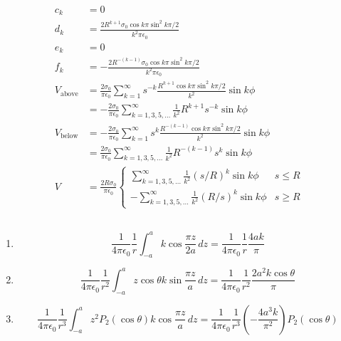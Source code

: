 \documentclass{article}
\newcommand{\ke}{\frac{1}{4 \pi \epsilon_0}}
\begin{document}
\begin{align*}
  c_k            & = 0                                                                                                                           \\
  d_k            & = \frac{2 R^{k + 1} \sigma_0 \cos k \pi \sin^2 k \pi / 2}{k^2 \pi \epsilon_0}                                                 \\
  e_k            & = 0                                                                                                                           \\
  f_k            & = -\frac{2 R^{-(k - 1)} \sigma_0 \cos k \pi \sin^2 k \pi / 2}{k^2 \pi \epsilon_0}                                             \\
  V_\text{above} & = \frac{2 \sigma_0}{\pi \epsilon_0} \sum_{k = 1}^\infty s^{-k} \frac{R^{k + 1} \cos k \pi \sin^2 k \pi / 2}{k^2} \sin k \phi  \\
                 & = -\frac{2 \sigma_0}{\pi \epsilon_0} \sum_{k = 1, 3, 5, \ldots}^\infty \frac{1}{k^2} R^{k + 1} s^{-k} \sin k \phi             \\
  V_\text{below} & = -\frac{2 \sigma_0}{\pi \epsilon_0} \sum_{k = 1}^\infty s^k \frac{R^{-(k - 1)} \cos k \pi \sin^2 k \pi / 2}{k^2} \sin k \phi \\
                 & = \frac{2 \sigma_0}{\pi \epsilon_0} \sum_{k = 1, 3, 5, \ldots}^\infty \frac{1}{k^2} R^{-(k - 1)} s^k \sin k \phi              \\
  V              & = \frac{2 R \sigma_0}{\pi \epsilon_0} \begin{cases}
                                                           \sum_{k = 1, 3, 5, \ldots}^\infty \frac{1}{k^2} (s / R)^k \sin k \phi  & s \le R \\
                                                           -\sum_{k = 1, 3, 5, \ldots}^\infty \frac{1}{k^2} (R / s)^k \sin k \phi & s \ge R
                                                         \end{cases}
\end{align*}

\subsection{}

\begin{enumerate}
  \item \[\ke \frac{1}{r} \int_{-a}^a k \cos \frac{\pi z}{2 a} \,d z = \ke \frac{1}{r} \frac{4 a k}{\pi}\]

  \item \[\ke \frac{1}{r^2} \int_{-a}^a z \cos \theta k \sin \frac{\pi z}{a} \,d z = \ke \frac{1}{r^2} \frac{2 a^2 k \cos \theta}{\pi}\]

  \item \[\ke \frac{1}{r^3} \int_{-a}^a z^2 P_2(\cos \theta) k \cos \frac{\pi z}{a} \,d z = \ke \frac{1}{r^3} \left( -\frac{4 a^3 k}{\pi^2} \right) P_2(\cos \theta)\]
\end{enumerate}
\end{document}
